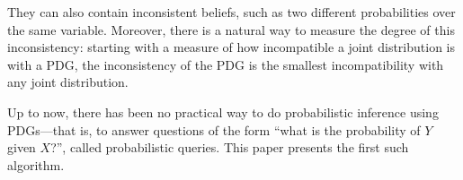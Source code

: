 \documentclass[twoside]{article}
\newcommand\vjoe[1]{{\color{joecolor}\textbf{$\boldsymbol\{$Joe: }#1 \textbf{$\boldsymbol\}$}}}
\newcommand\voli[1]{{\color{olicolor}\textbf{$\boldsymbol\{$Oli: }#1 \textbf{$\boldsymbol\}$}}}
\begin{document}
%
They can also contain inconsistent beliefs, such as two different probabilities over the same variable. Moreover, there is a natural way to measure the degree of this inconsistency: starting with a measure of how incompatible a joint distribution is with a PDG, the inconsistency of the PDG is the smallest incompatibility with any joint distribution. 

Up to now,
there has been no practical way to do probabilistic inference using
PDGs---that is,
to answer questions of the form
``what is the probability of $Y$ given $X$?'',
called probabilistic queries. 
This paper presents the first such {\color{red}algorithm}.
\end{document}
